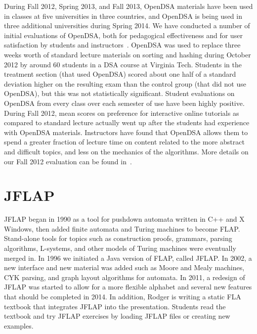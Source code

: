 \documentclass[11pt]{article}
\begin{document}
During Fall 2012, Spring 2013, and Fall 2013, OpenDSA materials have
been used in classes at five universities in three countries,
and OpenDSA is being used in three additional universities during
Spring 2014.
We have conducted a number of initial evaluations of OpenDSA, both for
pedagogical effectiveness and for user satisfaction by students and
instructors~\cite{Hall13}.
OpenDSA was used to replace three weeks worth of standard lecture
materials on sorting and hashing during October 2012 by around 60
students in a DSA course at Virginia Tech.
Students in the treatment section (that used OpenDSA) scored about one
half of a standard deviation higher on the resulting exam than the
control group (that did not use OpenDSA), but this was not
statistically significant.
Student evaluations on OpenDSA from every class over each semester of
use have been highly positive.
During Fall 2012, mean scores on preference for interactive online
tutorials as compared to standard lecture actually went up after
the students had experience with OpenDSA materials.
Instructors have found that OpenDSA allows them to spend a greater
fraction of lecture time on content related to the more abstract and
difficult topics, and less on the mechanics of the algorithms.
More details on our Fall 2012 evaluation can be found in~\cite{Hall13}.

\section{JFLAP}
\label{JFlap}

JFLAP began in 1990 as a tool for pushdown automata written in C++ and
X Windows, then added finite automata and Turing machines to become
FLAP.
Stand-alone tools for topics such as construction proofs, grammars,
parsing algorithms, L-systems, and other models of Turing machines
were eventually merged in.  
In 1996 we initiated a Java version of FLAP, called JFLAP.
In 2002, a new interface and new material was added such as
Moore and Mealy machines, CYK parsing, and graph layout algorithms for
automata.
In 2011, a redesign of JFLAP was started to allow for a more flexible
alphabet and several new features that should be completed in 2014.
In addition, Rodger is writing a static FLA textbook that integrates
JFLAP into the presentation.
Students read the textbook and try JFLAP exercises by loading JFLAP
files or creating new examples. 
\end{document}
